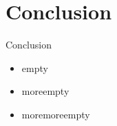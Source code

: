 \section{Conclusion}
\begin{frame}{Conclusion}

	\begin{minipage}[c][4cm]{\textwidth}
		\begin{itemize}\itemfill
			\item empty
			\item moreempty
			\item moremoreempty
		\end{itemize}
	\end{minipage}
	
\end{frame}
